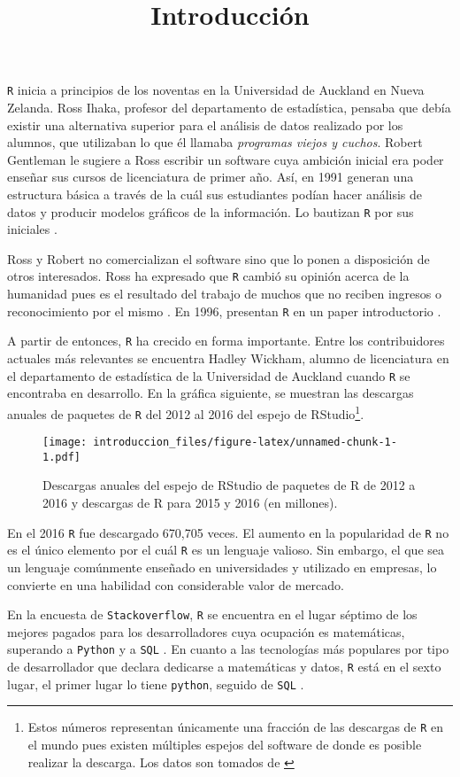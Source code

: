 \documentclass[]{article}
\title{Introducción}
\author{}
\date{}
\let\rmarkdownfootnote\footnote%
\def\footnote{\protect\rmarkdownfootnote}
\begin{document}
\texttt{R} inicia a principios de los noventas en la Universidad de
Auckland en Nueva Zelanda. Ross Ihaka, profesor del departamento de
estadística, pensaba que debía existir una alternativa superior para el
análisis de datos realizado por los alumnos, que utilizaban lo que él
llamaba \emph{programas viejos y cuchos}. Robert Gentleman le sugiere a
Ross escribir un software cuya ambición inicial era poder enseñar sus
cursos de licenciatura de primer año. Así, en 1991 generan una
estructura básica a través de la cuál sus estudiantes podían hacer
análisis de datos y producir modelos gráficos de la información. Lo
bautizan \texttt{R} por sus iniciales \parencite{rorigins}.

Ross y Robert no comercializan el software sino que lo ponen a
disposición de otros interesados. Ross ha expresado que \texttt{R}
cambió su opinión acerca de la humanidad pues es el resultado del
trabajo de muchos que no reciben ingresos o reconocimiento por el mismo
\parencite{rorigins}. En 1996, presentan \texttt{R} en un paper
introductorio \parencite{ihaka1996r}.

A partir de entonces, \texttt{R} ha crecido en forma importante. Entre
los contribuidores actuales más relevantes se encuentra Hadley Wickham,
alumno de licenciatura en el departamento de estadística de la
Universidad de Auckland cuando \texttt{R} se encontraba en desarrollo.
En la gráfica siguiente, se muestran las descargas anuales de paquetes
de \texttt{R} del 2012 al 2016 del espejo de
RStudio\footnote{Estos números representan únicamente una fracción de las descargas de \texttt{R} en el mundo pues existen múltiples espejos del software de donde es posible realizar la descarga. Los datos son tomados de \textcite{cranlogs}}.

\begin{figure}
\centering
\texttt{[image: introduccion\_files/figure-latex/unnamed-chunk-1-1.pdf]}
\caption{Descargas anuales del espejo de RStudio de paquetes de R de
2012 a 2016 y descargas de R para 2015 y 2016 (en millones).}
\end{figure}

En el 2016 \texttt{R} fue descargado 670,705 veces. El aumento en la
popularidad de \texttt{R} no es el único elemento por el cuál \texttt{R}
es un lenguaje valioso. Sin embargo, el que sea un lenguaje comúnmente
enseñado en universidades y utilizado en empresas, lo convierte en una
habilidad con considerable valor de mercado.

En la encuesta de \texttt{Stackoverflow}, \texttt{R} se encuentra en el
lugar séptimo de los mejores pagados para los desarrolladores cuya
ocupación es matemáticas, superando a \texttt{Python} y a \texttt{SQL}
\parencite[][Top paying tech per occupation, mathematics]{stackoverflowsurvey16}.
En cuanto a las tecnologías más populares por tipo de desarrollador que
declara dedicarse a matemáticas y datos, \texttt{R} está en el sexto
lugar, el primer lugar lo tiene \texttt{python}, seguido de \texttt{SQL}
\parencite[][Most Popular Technologies per Dev Type, Math and Data]{stackoverflowsurvey16}.
\end{document}
